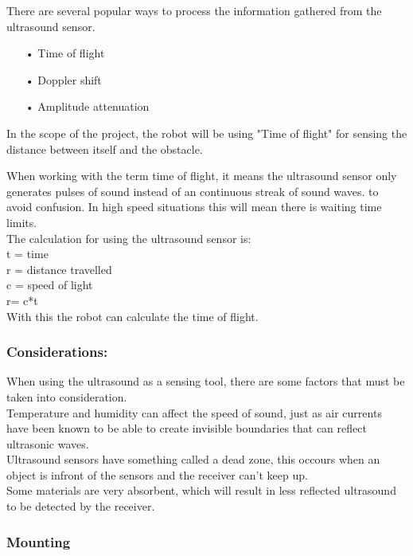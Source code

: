 There are several popular ways to process the information gathered from the ultrasound sensor. \\

\begin{enumerate}
	\item[•]Time of flight
	\item[•]Doppler shift
	\item[•]Amplitude attenuation
\end{enumerate}

In the scope of the project, the robot will be using "Time of flight" for sensing the distance between itself and the obstacle.\

When working with the term time of flight, it means the ultrasound sensor only generates pulses of sound instead of an continuous streak of sound waves. to avoid confusion. In high speed situations this will mean there is waiting time limits.\\ 

The calculation for using the ultrasound sensor is: \\

t = time\\
r = distance travelled\\
c = speed of light\\

r= c*t\\

With this the robot can calculate the time of flight.\

\subsubsection{Considerations:}
When using the ultrasound as a sensing tool, there are some factors that must be taken into consideration.\\ Temperature and humidity can affect the speed of sound, just as air currents have been known to be able to create invisible boundaries that can reflect ultrasonic waves.\\
Ultrasound sensors have something called a dead zone, this occours when an object is infront of the sensors and the receiver can't keep up.\\
Some materials are very absorbent, which will result in less reflected ultrasound to be detected by the receiver.

\subsubsection{Mounting}


